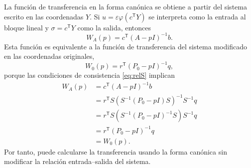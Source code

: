 \documentclass[journal]{IEEEtran}
\begin{document}
\noindent La función de transferencia en la forma canónica se obtiene a partir
del sistema escrito en las coordenadas \(Y\). Si \(u=\varepsilon
\varphi(c^\mathsf{T}Y)\) se interpreta como la entrada al bloque lineal y
\(\sigma=c^\mathsf{T}Y\) como la salida, entonces
\[
W_A(p)=c^\mathsf{T}(A-pI)^{-1}b.
\]
Esta función es equivalente a la función de transferencia del sistema
modificado en las coordenadas originales,
\begin{equation}
  W_0(p)=r^\mathsf{T}(P_0-pI)^{-1}q,
  \label{eq:W0_modificado}
\end{equation}
porque las condiciones de consistencia \eqref{eq:relS} implican
\[
\begin{aligned}
W_A(p)
&=c^\mathsf{T}(A-pI)^{-1}b\\
&=r^\mathsf{T}S\left(S^{-1}(P_0-pI)S\right)^{-1}S^{-1}q\\
&=r^\mathsf{T}S\left(S^{-1}(P_0-pI)^{-1}S\right)S^{-1}q\\
&=r^\mathsf{T}(P_0-pI)^{-1}q\\
&=W_0(p).
\end{aligned}
\]
Por tanto, puede calcularse la transferencia usando la forma canónica sin
modificar la relación entrada--salida del sistema.
\end{document}
